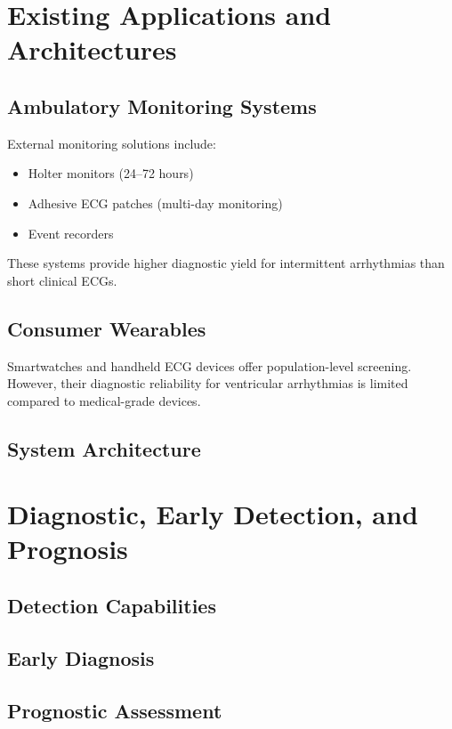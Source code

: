 \documentclass[conference]{IEEEtran}
\begin{document}
\section{Existing Applications and Architectures}

\subsection{Ambulatory Monitoring Systems}

External monitoring solutions include:

\begin{itemize}
    \item Holter monitors (24–72 hours)
    \item Adhesive ECG patches (multi-day monitoring)
    \item Event recorders
\end{itemize}

These systems provide higher diagnostic yield for intermittent arrhythmias than
short clinical ECGs.

\subsection{Consumer Wearables}
Smartwatches and handheld ECG devices offer population-level screening.
However, their diagnostic reliability for ventricular arrhythmias is limited
compared to medical-grade devices.

\subsection{System Architecture}


\section{Diagnostic, Early Detection, and Prognosis}
\subsection{Detection Capabilities}

\subsection{Early Diagnosis}
\subsection{Prognostic Assessment}
\end{document}
